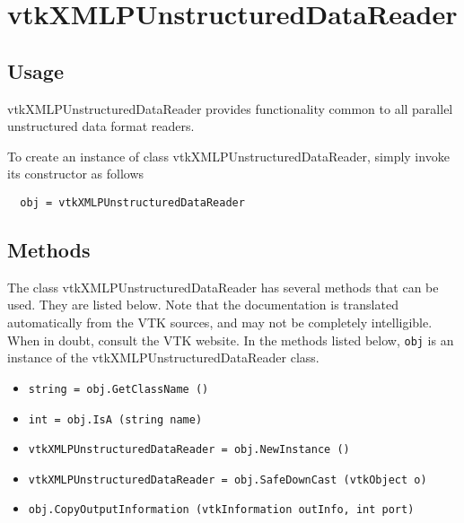 \section{vtkXMLPUnstructuredDataReader}

\subsection{Usage}

 vtkXMLPUnstructuredDataReader provides functionality common to all
 parallel unstructured data format readers.

To create an instance of class vtkXMLPUnstructuredDataReader, simply
invoke its constructor as follows
\begin{verbatim}
  obj = vtkXMLPUnstructuredDataReader
\end{verbatim}
\subsection{Methods}

The class vtkXMLPUnstructuredDataReader has several methods that can be used.
  They are listed below.
Note that the documentation is translated automatically from the VTK sources,
and may not be completely intelligible.  When in doubt, consult the VTK website.
In the methods listed below, \verb|obj| is an instance of the vtkXMLPUnstructuredDataReader class.
\begin{itemize}
\item  \verb|string = obj.GetClassName ()|

\item  \verb|int = obj.IsA (string name)|

\item  \verb|vtkXMLPUnstructuredDataReader = obj.NewInstance ()|

\item  \verb|vtkXMLPUnstructuredDataReader = obj.SafeDownCast (vtkObject o)|

\item  \verb|obj.CopyOutputInformation (vtkInformation outInfo, int port)|

\end{itemize}
